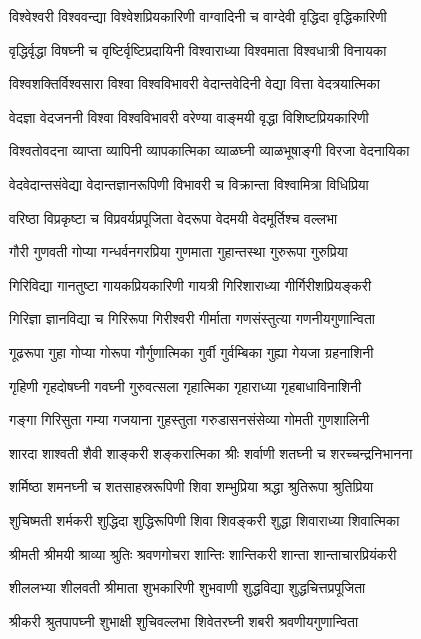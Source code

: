 \twolineshloka
{विश्वेश्वरी विश्ववन्द्या विश्वेशप्रियकारिणी}
{वाग्वादिनी च वाग्देवी वृद्धिदा वृद्धिकारिणी}%

\twolineshloka
{वृद्धिर्वृद्धा विषघ्नी च वृष्टिर्वृष्टिप्रदायिनी}
{विश्वाराध्या विश्वमाता विश्वधात्री विनायका}%

\twolineshloka
{विश्वशक्तिर्विश्वसारा विश्वा विश्वविभावरी}
{वेदान्तवेदिनी वेद्या वित्ता वेदत्रयात्मिका}%

\twolineshloka
{वेदज्ञा वेदजननी विश्वा विश्वविभावरी}
{वरेण्या वाङ्मयी वृद्धा विशिष्टप्रियकारिणी}%

\twolineshloka
{विश्वतोवदना व्याप्ता व्यापिनी व्यापकात्मिका}
{व्याळघ्नी व्याळभूषाङ्गी विरजा वेदनायिका}%

\twolineshloka
{वेदवेदान्तसंवेद्या वेदान्तज्ञानरूपिणी}
{विभावरी च विक्रान्ता विश्वामित्रा विधिप्रिया}%

\twolineshloka
{वरिष्ठा विप्रकृष्टा च विप्रवर्यप्रपूजिता}
{वेदरूपा वेदमयी वेदमूर्तिश्च वल्लभा}%

\twolineshloka
{गौरी गुणवती गोप्या गन्धर्वनगरप्रिया}
{गुणमाता गुहान्तस्था गुरुरूपा गुरुप्रिया}%

\twolineshloka
{गिरिविद्या गानतुष्टा गायकप्रियकारिणी}
{गायत्री गिरिशाराध्या गीर्गिरीशप्रियङ्करी}%

\twolineshloka
{गिरिज्ञा ज्ञानविद्या च गिरिरूपा गिरीश्वरी}
{गीर्माता गणसंस्तुत्या गणनीयगुणान्विता}%

\twolineshloka
{गूढरूपा गुहा गोप्या गोरूपा गौर्गुणात्मिका}
{गुर्वी गुर्वम्बिका गुह्या गेयजा ग्रहनाशिनी}%

\twolineshloka
{गृहिणी गृहदोषघ्नी गवघ्नी गुरुवत्सला}
{गृहात्मिका गृहाराध्या गृहबाधाविनाशिनी}%

\twolineshloka
{गङ्गा गिरिसुता गम्या गजयाना गुहस्तुता}
{गरुडासनसंसेव्या गोमती गुणशालिनी}%

\twolineshloka
{शारदा शाश्वती शैवी शाङ्करी शङ्करात्मिका}
{श्रीः शर्वाणी शतघ्नी च शरच्चन्द्रनिभानना}%

\twolineshloka
{शर्मिष्ठा शमनघ्नी च शतसाहस्ररूपिणी}
{शिवा शम्भुप्रिया श्रद्धा श्रुतिरूपा श्रुतिप्रिया}%

\twolineshloka
{शुचिष्मती शर्मकरी शुद्धिदा शुद्धिरूपिणी}
{शिवा शिवङ्करी शुद्धा शिवाराध्या शिवात्मिका}%

\twolineshloka
{श्रीमती श्रीमयी श्राव्या श्रुतिः श्रवणगोचरा}
{शान्तिः शान्तिकरी शान्ता शान्ताचारप्रियंकरी}%

\twolineshloka
{शीललभ्या शीलवती श्रीमाता शुभकारिणी}
{शुभवाणी शुद्धविद्या शुद्धचित्तप्रपूजिता}%

\twolineshloka
{श्रीकरी श्रुतपापघ्नी शुभाक्षी शुचिवल्लभा}
{शिवेतरघ्नी शबरी श्रवणीयगुणान्विता}%

